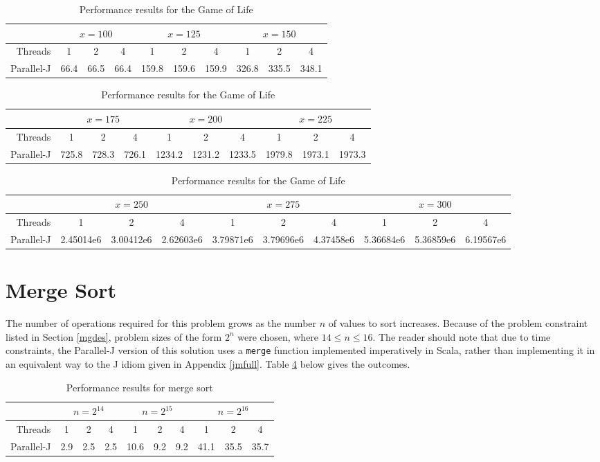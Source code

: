 \begin{table}[htbp]
\begin{tabular}{|r||c|c|c||c|c|c||c|c|c||}
	\hline
		& \multicolumn{3}{|c|}{$x=100$} & \multicolumn{3}{|c|}{$x=125$} & \multicolumn{3}{|c|}{$x=150$} \\
	\hline
		Threads & 1 & 2 & 4 & 1 & 2 & 4 & 1 & 2 & 4 \\
	\hline
	\hline
		Parallel-J & 66.4 & 66.5 & 66.4 & 159.8 & 159.6 & 159.9 & 326.8 & 335.5 & 348.1 \\
	\hline
\end{tabular}
\begin{tabular}{|r||c|c|c||c|c|c||c|c|c||}
	\hline
		& \multicolumn{3}{|c|}{$x=175$} & \multicolumn{3}{|c|}{$x=200$} & \multicolumn{3}{|c|}{$x=225$} \\
	\hline
		Threads & 1 & 2 & 4 & 1 & 2 & 4 & 1 & 2 & 4 \\
	\hline
	\hline
		Parallel-J & 725.8 & 728.3 & 726.1 & 1234.2 & 1231.2 & 1233.5 & 1979.8 & 1973.1 & 1973.3 \\
	\hline
\end{tabular}
\begin{tabular}{|r||c|c|c||c|c|c||c|c|c||}
	\hline
		& \multicolumn{3}{|c|}{$x=250$} & \multicolumn{3}{|c|}{$x=275$} & \multicolumn{3}{|c|}{$x=300$} \\
	\hline
		Threads & 1 & 2 & 4 & 1 & 2 & 4 & 1 & 2 & 4 \\
	\hline
	\hline
		Parallel-J & 2.45014e6 & 3.00412e6 & 2.62603e6 & 3.79871e6 & 3.79696e6 & 4.37458e6 & 5.36684e6 & 5.36859e6 & 6.19567e6 \\
	\hline
\end{tabular}
\caption{Performance results for the Game of Life}
\label{tgol}
\end{table}

\section{Merge Sort}
The number of operations required for this problem 
grows as the number $n$ of values to sort increases. 
Because of the problem constraint listed in Section \ref{mgdes}, 
problem sizes of the form $2^n$ were chosen, 
where $14 \le n \le 16$. 
The reader should note that due to time constraints, 
the Parallel-J version of this solution uses a \texttt{merge} function 
implemented imperatively in Scala, rather than 
implementing it in an equivalent way to the J idiom given in Appendix \ref{jmfull}.
Table \ref{tmrg} below gives the outcomes.

\begin{table}[htbp]
\begin{tabular}{|r||c|c|c||c|c|c||c|c|c||}
	\hline
		& \multicolumn{3}{|c|}{$n=2^{14}$} & \multicolumn{3}{|c|}{$n=2^{15}$}& \multicolumn{3}{|c|}{$n=2^{16}$} \\
	\hline
		Threads & 1 & 2 & 4 & 1 & 2 & 4 & 1 & 2 & 4 \\
	\hline
	\hline
		Parallel-J & 2.9 & 2.5 & 2.5 & 10.6 & 9.2 & 9.2 & 41.1 & 35.5 & 35.7 \\
	\hline
\end{tabular}
\caption{Performance results for merge sort}
\label{tmrg}
\end{table}
